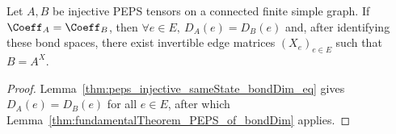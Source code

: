 \begin{theorem}%
    \label{thm:fundamentalTheorem_PEPS}
    \leanok
    Let $A,B$ be injective PEPS tensors on a connected finite simple graph. If
    $\Coeff_A=\Coeff_B$, then $\forall e\in E,\ D_A(e)=D_B(e)$ and, after
    identifying these bond spaces, there exist invertible edge matrices
    $(X_e)_{e\in E}$ such that $B=A^X$.
\end{theorem}
\begin{proof}\leanok
    Lemma~\ref{thm:peps_injective_sameState_bondDim_eq} gives $D_A(e)=D_B(e)$
    for all $e\in E$, after which
    Lemma~\ref{thm:fundamentalTheorem_PEPS_of_bondDim} applies.
\end{proof}
